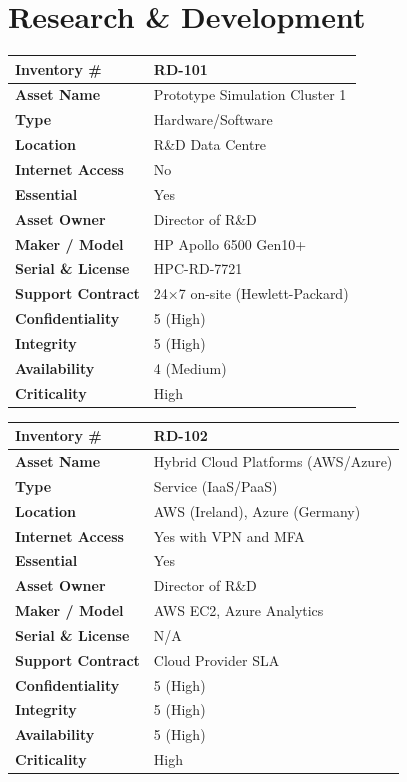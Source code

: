 \section*{Research \& Development}

\begin{longtable}{|p{4cm}|p{9cm}|}
\hline
\textbf{Inventory \#} & RD-101 \\\hline
\textbf{Asset Name} & Prototype Simulation Cluster 1 \\\hline
\textbf{Type} & Hardware/Software \\\hline
\textbf{Location} & R\&D Data Centre \\\hline
\textbf{Internet Access} & No \\\hline
\textbf{Essential} & Yes \\\hline
\textbf{Asset Owner} & Director of R\&D \\\hline
\textbf{Maker / Model} & HP Apollo 6500 Gen10+ \\\hline
\textbf{Serial \& License} & HPC-RD-7721 \\\hline
\textbf{Support Contract} & 24×7 on-site (Hewlett-Packard) \\\hline
\textbf{Confidentiality} & 5 (High) \\\hline
\textbf{Integrity} & 5 (High) \\\hline
\textbf{Availability} & 4 (Medium) \\\hline
\textbf{Criticality} & High \\\hline
\end{longtable}

\begin{longtable}{|p{4cm}|p{9cm}|}
\hline
\textbf{Inventory \#} & RD-102 \\\hline
\textbf{Asset Name} & Hybrid Cloud Platforms (AWS/Azure) \\\hline
\textbf{Type} & Service (\ac{IaaS}/\ac{PaaS}) \\\hline
\textbf{Location} & AWS (Ireland), Azure (Germany) \\\hline
\textbf{Internet Access} & Yes with \ac{VPN} and \ac{MFA} \\\hline
\textbf{Essential} & Yes \\\hline
\textbf{Asset Owner} & Director of R\&D \\\hline
\textbf{Maker / Model} & AWS EC2, Azure Analytics \\\hline
\textbf{Serial \& License} & N/A \\\hline
\textbf{Support Contract} & Cloud Provider \ac{SLA} \\\hline
\textbf{Confidentiality} & 5 (High) \\\hline
\textbf{Integrity} & 5 (High) \\\hline
\textbf{Availability} & 5 (High) \\\hline
\textbf{Criticality} & High \\\hline
\end{longtable}

